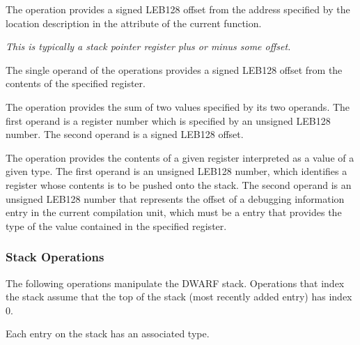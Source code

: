 \begin{enumerate}[1. ]
\itembfnl{\DWOPfbregTARG}
The \DWOPfbregNAME{} operation provides a 
signed LEB128 offset
from the address specified by the location description in the
\DWATframebase{} attribute of the current function.
 
\bb
\textit{This is typically a stack pointer register plus or minus some offset.}
\eb

\itembfnl{\DWOPbregzeroTARG, \DWOPbregoneTARG, \dots, \DWOPbregthirtyoneTARG}
The single operand of the \DWOPbregnTARG{} 
operations provides
a signed LEB128 offset from
\bb
the contents of
\eb
the specified register.

\itembfnl{\DWOPbregxTARG}
The \DWOPbregxNAME{} operation provides the sum of two values specified
by its two operands. The first operand is a register number
which is specified by an unsigned LEB128
number. The second operand is a signed LEB128 offset.

\itembfnl{\DWOPregvaltypeTARG}
The \DWOPregvaltypeNAME{} operation provides the contents of
a given register interpreted as a value of a given type. The first 
operand is an unsigned LEB128 number, 
which identifies a register whose contents is to
be pushed onto the stack. The second operand is an 
unsigned LEB128 number
that represents the offset of a debugging information entry in the current
compilation unit, which must be a \DWTAGbasetype{} entry that provides the
type of the value contained in the specified register.

\end{enumerate}

\subsubsection{Stack Operations}
\label{chap:stackoperations}
The following 
operations manipulate the DWARF stack. Operations
that index the stack assume that the top of the stack (most
recently added entry) has index 0.

\bb
Each entry on the stack has an associated type.
\eb

